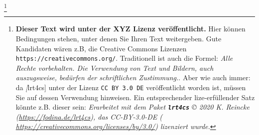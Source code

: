 

\footnote{\textbf{Dieser Text wird unter der XYZ Lizenz veröffentlicht.}
Hier können Bedingungen stehen, unter denen Sie Ihren Text weitergeben.
Gute Kandidaten wären z.B, die Creative Commons Lizenzen
\texttt{https://creativecommons.org/}. Traditionell ist auch die Formel:
\emph{Alle Rechte vorbehalten. Die Verwendung von Text und Bildern, auch
auszugsweise, bedürfen der schriftlichen Zustimmung.}. Aber wie auch immer: da \textit[lrt4cs] unter der Lizenz \texttt{CC BY 3.0 DE} veröffentlicht worden ist, müssen Sie auf dessen Verwendung hinweisen. Ein entsprechender lize-erfüllender Satz könnte z.B. dieser sein:
\newline
{\small \itshape Erarbeitet mit dem Paket \texttt{\textbf{lrt4cs}} \copyright{} 2020 K. Reincke (\href{https://fodina.de/lrt4cs}{https://fodina.de/lrt4cs}), das CC-BY-3.0-DE ( \href{https://creativecommons.org/licenses/by/3.0/}{https://creativecommons.org/licenses/by/3.0/}) lizenziert wurde.}}
